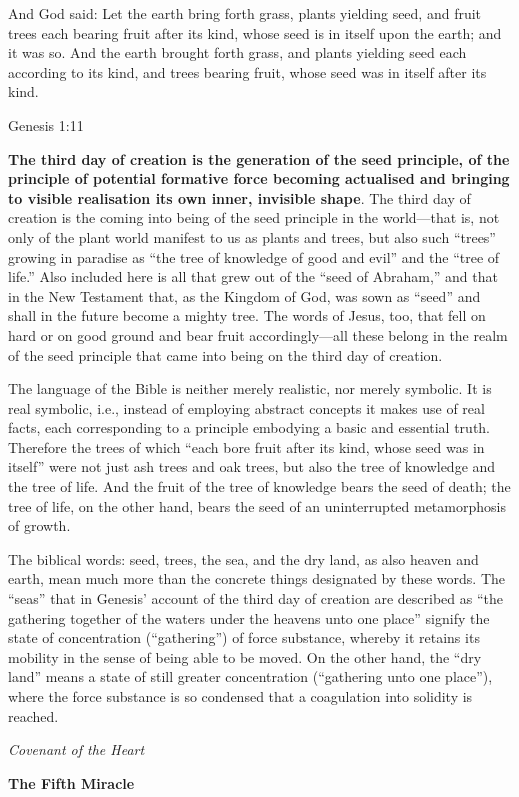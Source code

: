And God said: Let the earth bring forth grass, plants yielding seed, and fruit trees each bearing fruit after its kind,
whose seed is in itself upon the earth; and it was so. And the earth brought forth grass, and plants yielding seed each
according to its kind, and trees bearing fruit, whose seed was in itself after its kind. \begin{flushright} Genesis 1:11\end{flushright}

\textbf{The third day of creation is the generation of the seed principle, of the principle of potential formative force
becoming actualised and bringing to visible realisation its own inner, invisible shape}. The third day of creation is
the coming into being of the seed principle in the world—that is, not only of the plant world
manifest to us as plants and trees, but also such “trees” growing in paradise as “the tree of knowledge of good and
evil” and the “tree of life.” Also included here is all that grew out of the “seed of Abraham,” and that in the New
Testament that, as the Kingdom of God, was sown as “seed” and shall in the future become a mighty tree. The words of
Jesus, too, that fell on hard or on good ground and bear fruit accordingly—all these belong in the
realm of the seed principle that came into being on the third day of creation.

The language of the Bible is neither merely realistic, nor merely symbolic. It is real symbolic, i.e., instead of
employing abstract concepts it makes use of real facts, each corresponding to a principle embodying a basic and
essential truth. Therefore the trees of which “each bore fruit after its kind, whose seed was in itself” were not just
ash trees and oak trees, but also the tree of knowledge and the tree of life. And the fruit of the tree of knowledge
bears the seed of death; the tree of life, on the other hand, bears the seed of an uninterrupted metamorphosis of
growth.

\begin{quotationx}
The biblical words: seed, trees, the sea, and the dry land, as also heaven and earth, mean much more than the concrete
things designated by these words. The “seas” that in Genesis' account of the third day of creation
are described as “the gathering together of the waters under the heavens unto one place” signify the state of
concentration (“gathering”) of force substance, whereby it retains its mobility in the sense of being able to be moved.
On the other hand, the “dry land” means a state of still greater concentration (“gathering unto one place”), where the
force substance is so condensed that a coagulation into solidity is reached. \begin{flushright} \emph{Covenant of the Heart}\end{flushright}

\end{quotationx}
\textbf{The Fifth Miracle}

